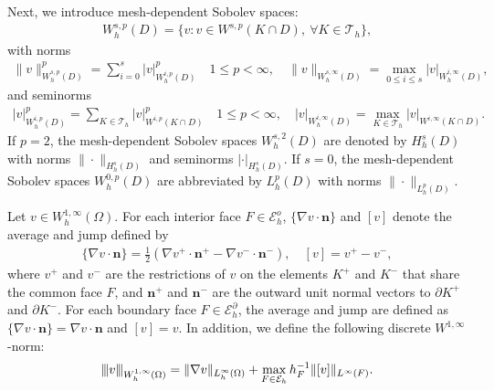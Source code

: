 \documentclass[1996/10/24]{amsart}
\theoremstyle{definition}
\numberwithin{equation}{section}
\newcommand{\vertiii}[1]{{\left\vert\kern-0.25ex\left\vert\kern-0.25ex\left\vert #1
    \right\vert\kern-0.25ex\right\vert\kern-0.25ex\right\vert}}
\begin{document}
Next, we introduce mesh-dependent Sobolev spaces:
\begin{align*}
W^{s,p}_h(D)=\{v: v\in W^{s,p}(K\cap D), ~\forall K\in\mathcal{T}_h\},
\end{align*}
with norms
\begin{align*}
\|v\|_{W_h^{s,p}(D)}^p=\sum_{i=0}^s|v|_{W^{i,p}_h(D)}^p\quad 1\leq p<\infty,\quad \|v\|_{W_h^{s,\infty}(D)}=\max_{0\leq i\leq s}|v|_{W_h^{i,\infty}(D)},
\end{align*}
and seminorms
\begin{align*}
|v|_{W_h^{i,p}(D)}^p=\sum_{K\in\mathcal{T}_h}|v|^p_{W^{i,p}(K\cap D)}\quad 1\leq p<\infty,\quad |v|_{W^{i,\infty}_h(D)}=\max_{K\in\mathcal{T}_h}|v|_{W^{i,\infty}(K\cap D)}.
\end{align*}
If $p=2$, the mesh-dependent Sobolev spaces $W_h^{s,2}(D)$ are denoted by $H_h^s(D)$ with norms $\|\cdot\|_{H_h^s(D)}$ and  seminorms $|\cdot|_{H_h^s(D)}$.
If $s=0$, the mesh-dependent Sobolev spaces $W_h^{0,p}(D)$ are abbreviated by $L_h^p(D)$ with norms $\|\cdot\|_{L_h^p(D)}$.

Let $v \in W^{1,\infty}_{h}(\Omega)$. For each interior face
$F\in\mathcal{E}_h^o$, $\{\nabla v\cdot{\bm n}\}$ and $[v]$ denote the average and jump defined by
\begin{align}
\label{dg_notations}
\{\nabla v\cdot{\bm n}\}=\frac{1}{2}\left(\nabla v^+\cdot{\bm n}^+-\nabla v^-\cdot{\bm n}^-\right),\quad [v]=v^{+}-v^{-},
\end{align}
where $v^+$ and $v^-$ are the restrictions of $v$ on the elements $K^+$ and $K^-$ that share the common face $F$, and
${\bm n}^+$ and ${\bm n}^-$ are the outward unit normal vectors to $\partial K^+$ and $\partial K^-$. For each boundary
face $F\in\mathcal{E}_h^{\partial}$, the average and jump are defined as
$\{\nabla v\cdot{\bm n}\}=\nabla v\cdot{\bm n}$ and $[v]=v$.
In addition, we define the following discrete $W^{1,\infty}$-norm:
\begin{align}
\label{discrete_w_1_infinity_norm}
\vertiii{v}_{W_{h}^{1,\infty}(\Omega)} = \|\nabla v\|_{L_h^{\infty}(\Omega)}
+ \max_{F \in \mathcal{E}_{h}}h_{F}^{-1} \Vert [v] \Vert_{L^{\infty}(F)}.
\end{align}
\end{document}
